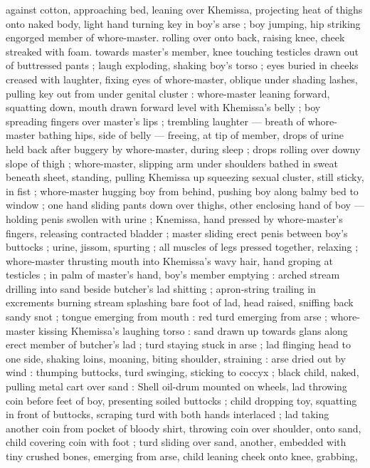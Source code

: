 {against cotton, approaching bed, leaning over Khemissa, projecting 
heat of thighs onto naked body, light hand turning key in boy's arse 
; boy jumping, hip striking engorged member of whore-master. 
rolling over onto back, raising knee, cheek streaked with foam. 
towards master's member, knee touching testicles drawn out of 
buttressed pants ; laugh exploding, shaking boy's torso ; eyes buried 
in cheeks creased with laughter, fixing eyes of whore-master, oblique 
under shading lashes, pulling key out from under genital cluster : 
whore-master leaning forward, squatting down, mouth drawn forward 
level with Khemissa's belly ; boy spreading fingers over master's lips 
; trembling laughter --- breath of whore-master bathing hips, side of 
belly --- freeing, at tip of member, drops of urine held back after 
buggery by whore-master, during sleep ; drops rolling over downy 
slope of thigh ; whore-master, slipping arm under shoulders bathed 
in sweat beneath sheet, standing, pulling Khemissa up squeezing 
sexual cluster, still sticky, in fist ; whore-master hugging boy from 
behind, pushing boy along balmy bed to window ; one hand sliding 
pants down over thighs, other enclosing hand of boy --- holding 
penis swollen with urine ; Knemissa, hand pressed by whore-master's 
fingers, releasing contracted bladder ; master sliding erect penis 
between boy's buttocks ; urine, jissom, spurting ; all muscles of legs 
pressed together, relaxing ; whore-master thrusting mouth into 
Khemissa's wavy hair, hand groping at testicles ; in palm of master's 
hand, boy's member emptying : arched stream drilling into sand 
beside butcher's lad shitting ; apron-string trailing in excrements 
burning stream splashing bare foot of lad, head raised, sniffing back 
sandy snot ; tongue emerging from mouth : red turd emerging from 
arse ; whore-master kissing Khemissa's laughing torso : sand drawn 
up towards glans along erect member of butcher's lad ; turd staying 
stuck in arse ; lad flinging head to one side, shaking loins, moaning, 
biting shoulder, straining : arse dried out by wind : thumping 
buttocks, turd swinging, sticking to coccyx ; black child, naked, 
pulling metal cart over sand : Shell oil-drum mounted on wheels, lad 
throwing coin before feet of boy, presenting soiled buttocks ; child 
dropping toy, squatting in front of buttocks, scraping turd with both 
hands interlaced ; lad taking another coin from pocket of bloody 
shirt, throwing coin over shoulder, onto sand, child covering coin with 
foot ; turd sliding over sand, another, embedded with tiny crushed 
bones, emerging from arse, child leaning cheek onto knee, grabbing, 
}
